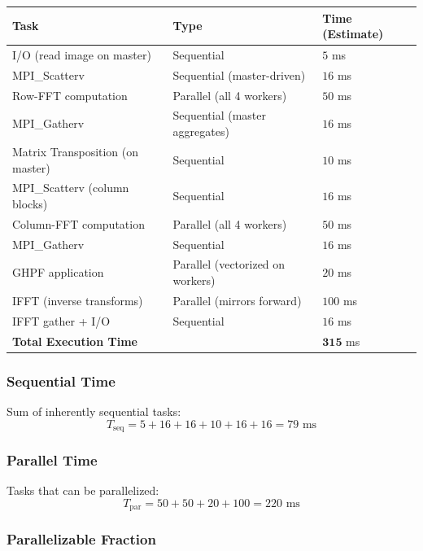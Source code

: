 \documentclass[11pt,a4paper]{article}
\begin{document}
\begin{table}[h]
    \centering
    \begin{tabular}{lll}
        \hline
        \textbf{Task} & \textbf{Type} & \textbf{Time (Estimate)} \\
        \hline
        I/O (read image on master) & Sequential & $5$ ms \\
        MPI\_Scatterv & Sequential (master-driven) & $16$ ms \\
        Row-FFT computation & Parallel (all 4 workers) & $50$ ms \\
        MPI\_Gatherv & Sequential (master aggregates) & $16$ ms \\
        Matrix Transposition (on master) & Sequential & $10$ ms \\
        MPI\_Scatterv (column blocks) & Sequential & $16$ ms \\
        Column-FFT computation & Parallel (all 4 workers) & $50$ ms \\
        MPI\_Gatherv & Sequential & $16$ ms \\
        GHPF application & Parallel (vectorized on workers) & $20$ ms \\
        IFFT (inverse transforms) & Parallel (mirrors forward) & $100$ ms \\
        IFFT gather + I/O & Sequential & $16$ ms \\
        \hline
        \textbf{Total Execution Time} & & $\mathbf{315}$ ms \\
        \hline
    \end{tabular}
\end{table}

\subsubsection{Sequential Time}

Sum of inherently sequential tasks:
\[
T_{\text{seq}} = 5 + 16 + 16 + 10 + 16 + 16 = 79 \text{ ms}
\]

\subsubsection{Parallel Time}

Tasks that can be parallelized:
\[
T_{\text{par}} = 50 + 50 + 20 + 100 = 220 \text{ ms}
\]

\subsubsection{Parallelizable Fraction}
\end{document}

